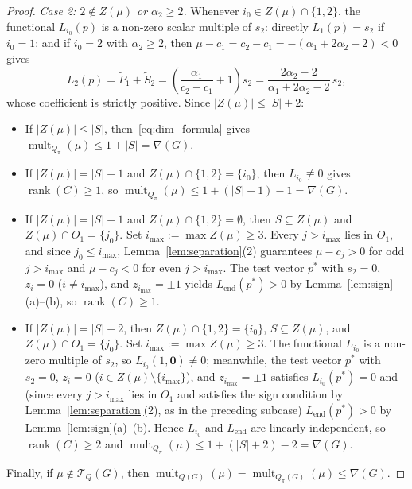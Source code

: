 \documentclass[11pt,a4paper]{article}
\theoremstyle{definition}
\DeclareMathOperator{\mult}{mult}
\DeclareMathOperator{\rank}{rank}
\begin{document}
\begin{proof}
  \emph{Case 2: $2 \notin Z(\mu)$ or $\alpha_2 \ge 2$.}
  Whenever $i_0 \in Z(\mu) \cap \{1,2\}$, the functional $L_{i_0}(p)$ is a non-zero scalar multiple of $s_2$: directly $L_1(p) = s_2$ if $i_0 = 1$; and if $i_0 = 2$ with $\alpha_2 \ge 2$, then $\mu - c_1 = c_2 - c_1 = -(\alpha_1 + 2\alpha_2 - 2) < 0$ gives
  \[
    L_2(p) = \tilde{P}_1 + \tilde{S}_2 = \left(\frac{\alpha_1}{c_2 - c_1} + 1\right) s_2 = \frac{2\alpha_2 - 2}{\alpha_1 + 2\alpha_2 - 2}\,s_2,
  \]
  whose coefficient is strictly positive. Since $|Z(\mu)| \le |S| + 2$:
  \begin{itemize}
    \item If $|Z(\mu)| \le |S|$, then~\eqref{eq:dim_formula} gives $\mult_{Q_\pi}(\mu) \le 1 + |S| = \nabla(G)$.
    \item If $|Z(\mu)| = |S| + 1$ and $Z(\mu) \cap \{1,2\} = \{i_0\}$, then $L_{i_0} \not\equiv 0$ gives $\rank(C) \ge 1$, so $\mult_{Q_\pi}(\mu) \le 1 + (|S|+1) - 1 = \nabla(G)$.
    \item If $|Z(\mu)| = |S| + 1$ and $Z(\mu) \cap \{1,2\} = \emptyset$, then $S \subseteq Z(\mu)$ and $Z(\mu) \cap O_1 = \{j_0\}$. Set $i_{\max} := \max Z(\mu) \ge 3$. Every $j > i_{\max}$ lies in $O_1$, and since $j_0 \le i_{\max}$, Lemma~\ref{lem:separation}(2) guarantees $\mu - c_j > 0$ for odd $j > i_{\max}$ and $\mu - c_j < 0$ for even $j > i_{\max}$. The test vector $p^*$ with $s_2 = 0$, $z_i = 0$ ($i \ne i_{\max}$), and $z_{i_{\max}} = \pm 1$ yields $L_{\mathrm{end}}(p^*) > 0$ by Lemma~\ref{lem:sign}(a)--(b), so $\rank(C) \ge 1$.
    \item If $|Z(\mu)| = |S| + 2$, then $Z(\mu) \cap \{1,2\} = \{i_0\}$, $S \subseteq Z(\mu)$, and $Z(\mu) \cap O_1 = \{j_0\}$. Set $i_{\max} := \max Z(\mu) \ge 3$. The functional $L_{i_0}$ is a non-zero multiple of $s_2$, so $L_{i_0}(1, \mathbf{0}) \ne 0$; meanwhile, the test vector $p^*$ with $s_2 = 0$, $z_i = 0$ ($i \in Z(\mu) \setminus \{i_{\max}\}$), and $z_{i_{\max}} = \pm 1$ satisfies $L_{i_0}(p^*) = 0$ and (since every $j > i_{\max}$ lies in $O_1$ and satisfies the sign condition by Lemma~\ref{lem:separation}(2), as in the preceding subcase) $L_{\mathrm{end}}(p^*) > 0$ by Lemma~\ref{lem:sign}(a)--(b). Hence $L_{i_0}$ and $L_{\mathrm{end}}$ are linearly independent, so $\rank(C) \ge 2$ and $\mult_{Q_\pi}(\mu) \le 1 + (|S|+2) - 2 = \nabla(G)$.
  \end{itemize}
  Finally, if $\mu \notin \mathcal{T}_Q(G)$, then $\mult_{Q(G)}(\mu) = \mult_{Q_\pi(G)}(\mu) \le \nabla(G)$.
\end{proof}
\end{document}
